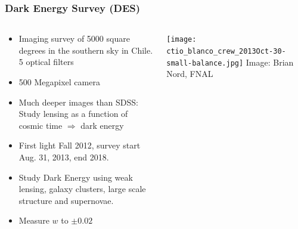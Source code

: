 \documentclass{beamer}
\begin{document}
\frame
{

    \frametitle{Dark Energy Survey (DES)}

    \fontsize{9}{0.8\baselineskip}

    \begin{columns}

        \begin{column}{0.5\textwidth}

            \begin{itemize}

                \item Imaging survey of 5000 square degrees in the southern
                    sky in Chile.  5 optical filters

                \item 500 Megapixel camera

                \item Much deeper images than SDSS: Study lensing as a function
                    of {\color{gold}cosmic time $\Rightarrow$ dark energy}

                \item First light Fall 2012, survey start Aug. 31, 2013, end 2018.

                \item Study Dark Energy using weak lensing, galaxy clusters,
                    large scale structure and supernovae.

                \item Measure {\color{gold} $w$} to {\color{gold} $\pm 0.02$}

            \end{itemize}

        \end{column}

        \begin{column}{0.5\textwidth}
            \texttt{[image: ctio\_blanco\_crew\_2013Oct-30-small-balance.jpg]}
            \newline
            \hfill {\tiny Image: Brian Nord, FNAL}
        \end{column}

    \end{columns}

}
\end{document}
